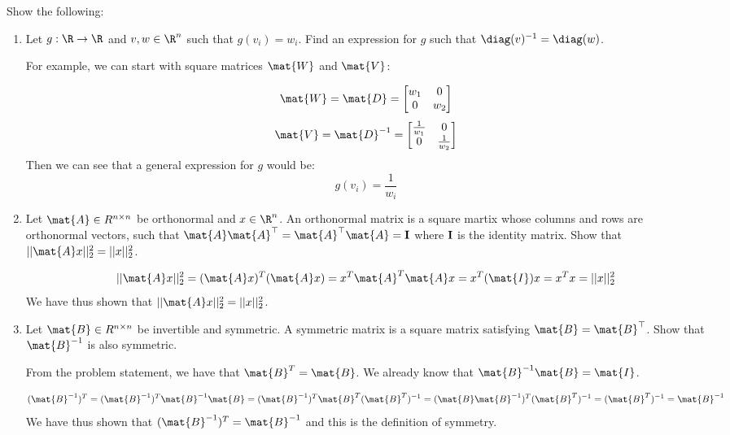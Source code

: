 \documentclass{article}
\begin{document}
\noindent\makebox[\linewidth]{\rule{\textwidth}{0.4pt}}
\begin{aprob}\label{prob:matrixtype}
    Show the following:
    \begin{enumerate}
        \item {} Let $g : \R \rightarrow \R$ and $v, w \in \R^n$ such that $g(v_i) = w_i$. Find an expression for $g$ such that $\diag(v)^{-1} = \diag(w)$.
        
        For example, we can start with square matrices $\mat{W}$ and $\mat{V}$:
        
        $$\mat{W} = \mat{D} = \begin{bmatrix} w_1 & 0 \\ 0 & w_2 \end{bmatrix}$$
        $$\mat{V} = \mat{D}^{-1} = \begin{bmatrix} \frac{1}{w_1} & 0 \\ 0 & \frac{1}{w_2} \end{bmatrix}$$
        Then we can see that a general expression for $g$ would be:
        $$g(v_i) = \frac{1}{w_i}$$
        
        \item {} Let $\mat{A} \in R^{n \times n}$ be orthonormal and $x \in \R^n$. 
        An orthonormal matrix is a square martix whose columns and rows are orthonormal vectors, such that $ \mat{A}\mat{A}^\top = \mat{A}^\top \mat{A} = {\bf I}$ where ${\bf I}$ is the identity matrix. 
        Show that $||\mat{A}x||_2^2 = ||x||_2^2$.
        
        $$||\mat{A}x||_2^2 = (\mat{A}x)^T(\mat{A}x) = x^T\mat{A}^T\mat{A}x = x^T(\mat{I})x = x^Tx = ||x||_2^2$$
        We have thus shown that $||\mat{A}x||_2^2 = ||x||_2^2$.

        \item {} Let $\mat{B} \in R^{n \times n}$ be invertible and symmetric. A symmetric matrix is a square matrix satisfying $\mat{B}=\mat{B}^\top$. Show that $\mat{B}^{-1}$ is also symmetric.
        
        From the problem statement, we have that $\mat{B}^T = \mat{B}$. We already know that $\mat{B}^{-1} \mat{B} = \mat{I}$.
        
        $$(\mat{B}^{-1})^T=(\mat{B}^{-1})^T\mat{B}^{-1}\mat{B}=(\mat{B}^{-1})^T \mat{B}^{T} (\mat{B}^{T})^{-1} = (\mat{B}\mat{B}^{-1})^T (\mat{B}^T)^{-1} = (\mat{B}^T)^{-1} = \mat{B}^{-1}$$
        We have thus shown that $(\mat{B}^{-1})^T=\mat{B}^{-1}$ and this is the definition of symmetry.
        

\end{enumerate}
\end{aprob}
\end{document}
